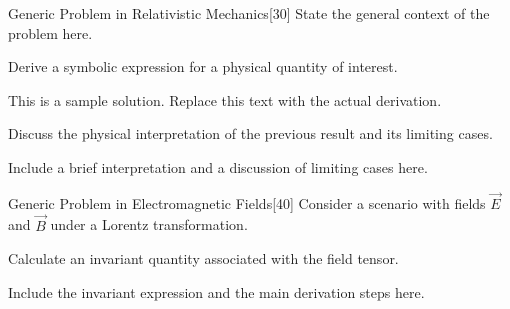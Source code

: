 \documentclass[11pt]{article}
\begin{document}
\makeexamheader

\begin{examproblems}

\problempage[header]
\begin{problem}{Generic Problem in Relativistic Mechanics}[30]
State the general context of the problem here.

\begin{questions}

\question Derive a symbolic expression for a physical quantity of interest.

\begin{solution}
This is a sample solution. Replace this text with the actual derivation.
\end{solution}

\hidequestion Discuss the physical interpretation of the previous result and its limiting cases.

\begin{solution}
Include a brief interpretation and a discussion of limiting cases here.
\end{solution}

\end{questions}
\end{problem}

\problempage[header]
\begin{problem}{Generic Problem in Electromagnetic Fields}[40]
Consider a scenario with fields \(\vec{E}\) and \(\vec{B}\) under a Lorentz transformation.

\begin{questions}

\question Calculate an invariant quantity associated with the field tensor.

\begin{solution}
Include the invariant expression and the main derivation steps here.
\end{solution}


\end{questions}
\end{problem}
\end{examproblems}
\end{document}
